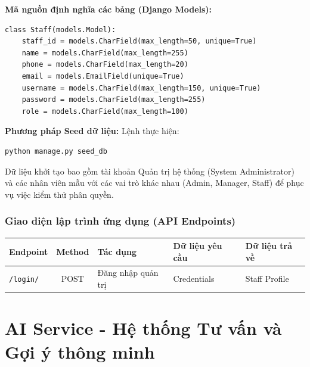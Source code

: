 \documentclass[12pt,a4paper]{report}
\begin{document}
\textbf{Mã nguồn định nghĩa các bảng (Django Models):}
\begin{verbatim}
class Staff(models.Model):
    staff_id = models.CharField(max_length=50, unique=True)
    name = models.CharField(max_length=255)
    phone = models.CharField(max_length=20)
    email = models.EmailField(unique=True)
    username = models.CharField(max_length=150, unique=True)
    password = models.CharField(max_length=255)
    role = models.CharField(max_length=100)
\end{verbatim}

\textbf{Phương pháp Seed dữ liệu:}
Lệnh thực hiện:
\begin{verbatim}
python manage.py seed_db
\end{verbatim}
Dữ liệu khởi tạo bao gồm tài khoản Quản trị hệ thống (System Administrator) và các nhân viên mẫu với các vai trò khác nhau (Admin, Manager, Staff) để phục vụ việc kiểm thử phân quyền.

\subsection{Giao diện lập trình ứng dụng (API Endpoints)}
\begin{table}[h!]
\centering
\begin{tabular}{|l|c|p{4cm}|p{3cm}|p{3cm}|}
\hline
\textbf{Endpoint} & \textbf{Method} & \textbf{Tác dụng} & \textbf{Dữ liệu yêu cầu} & \textbf{Dữ liệu trả về} \\ \hline
\texttt{/login/} & POST & Đăng nhập quản trị & Credentials & Staff Profile \\ \hline
\end{tabular}
\end{table}

\chapter{AI Service - Hệ thống Tư vấn và Gợi ý thông minh}
\end{document}

